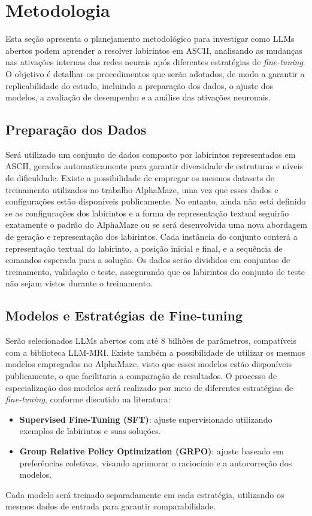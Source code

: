 \section{Metodologia}

Esta seção apresenta o planejamento metodológico para investigar como LLMs abertos podem aprender a resolver labirintos em ASCII, analisando as mudanças nas ativações internas das redes neurais após diferentes estratégias de \textit{fine-tuning}. O objetivo é detalhar os procedimentos que serão adotados, de modo a garantir a replicabilidade do estudo, incluindo a preparação dos dados, o ajuste dos modelos, a avaliação de desempenho e a análise das ativações neuronais.

\subsection{Preparação dos Dados}

Será utilizado um conjunto de dados composto por labirintos representados em ASCII, gerados automaticamente para garantir diversidade de estruturas e níveis de dificuldade. Existe a possibilidade de empregar os mesmos datasets de treinamento utilizados no trabalho AlphaMaze, uma vez que esses dados e configurações estão disponíveis publicamente. No entanto, ainda não está definido se as configurações dos labirintos e a forma de representação textual seguirão exatamente o padrão do AlphaMaze ou se será desenvolvida uma nova abordagem de geração e representação dos labirintos. Cada instância do conjunto conterá a representação textual do labirinto, a posição inicial e final, e a sequência de comandos esperada para a solução. Os dados serão divididos em conjuntos de treinamento, validação e teste, assegurando que os labirintos do conjunto de teste não sejam vistos durante o treinamento.

\subsection{Modelos e Estratégias de Fine-tuning}

Serão selecionados LLMs abertos com até 8 bilhões de parâmetros, compatíveis com a biblioteca LLM-MRI. Existe também a possibilidade de utilizar os mesmos modelos empregados no AlphaMaze, visto que esses modelos estão disponíveis publicamente, o que facilitaria a comparação de resultados. O processo de especialização dos modelos será realizado por meio de diferentes estratégias de \textit{fine-tuning}, conforme discutido na literatura:
\begin{itemize}
    \item \textbf{Supervised Fine-Tuning (SFT)}: ajuste supervisionado utilizando exemplos de labirintos e suas soluções.
    \item \textbf{Group Relative Policy Optimization (GRPO)}: ajuste baseado em preferências coletivas, visando aprimorar o raciocínio e a autocorreção dos modelos.
\end{itemize}
Cada modelo será treinado separadamente em cada estratégia, utilizando os mesmos dados de entrada para garantir comparabilidade.

